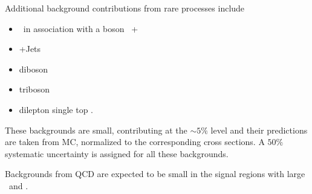 Additional background contributions from rare processes include
\begin{itemize}
\item  \ttbar\ in association with a boson \ttbar\ + \W\/\dy\ \\
\item \dy+Jets \\
\item diboson \vv\ \\
\item triboson \vvv\ \\
\item dilepton single top \tw. \\
\end{itemize}
These backgrounds are small, contributing at the $\sim 5\%$ level and their predictions are taken 
from MC, normalized to the corresponding cross sections. A $50\%$ systematic uncertainty is 
assigned for all these backgrounds.

Backgrounds from QCD are expected to be small in the signal regions with large \mt\ and \met.
